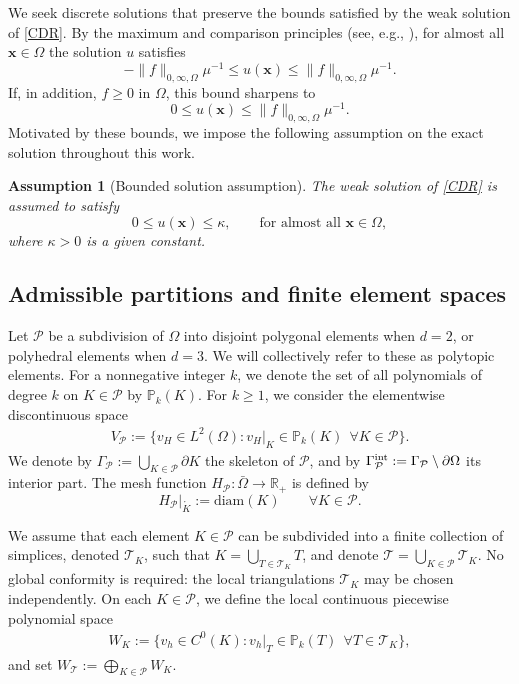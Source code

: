 \documentclass[11pt,final]{amsart}
\theoremstyle{plain}
\newtheorem{assumption}[theorem]{Assumption}
\theoremstyle{definition}
\newcommand\calP{{\mathcal{P}}}
\newcommand\calT{{\mathcal{T}}}
\begin{document}
We seek discrete solutions that preserve the bounds satisfied by the
weak solution of \eqref{CDR}.  By the maximum and comparison
principles (see, e.g., \cite[Corollary~4.4]{renardy2006introduction}),
for almost all $\boldsymbol{x} \in \Omega$ the solution $u$ satisfies
\begin{equation}
-\|f\|_{0,\infty,\Omega} \mu^{-1}  \le  u(\boldsymbol{x})  \le  \|f\|_{0,\infty,\Omega} \mu^{-1}.
\end{equation}
If, in addition, $f \ge 0$ in $\Omega$, this bound sharpens to
\begin{equation}
0  \le  u(\boldsymbol{x})  \le  \|f\|_{0,\infty,\Omega} \mu^{-1}.
\end{equation}
Motivated by these bounds, we impose the following assumption on the
exact solution throughout this work.
\begin{assumption}[Bounded solution assumption]
The weak solution of \eqref{CDR} is assumed to satisfy
\begin{equation}\label{eq14}
0  \leq  u(\boldsymbol{x})  \leq  \kappa, 
\qquad \text{for almost all } \boldsymbol{x} \in \Omega,
\end{equation}
where $\kappa > 0$ is a given constant.
\end{assumption}

\subsection{Admissible partitions and finite element spaces} \label{sec2.2}

Let $\calP$ be a subdivision of $\Omega$ into disjoint polygonal
elements when $d=2$, or polyhedral elements when $d=3$. We will
collectively refer to these as polytopic elements. For a nonnegative
integer $k$, we denote the set of all polynomials of degree $k$ on $K
\in \calP$ by $\mathbb{P}_{k}(K)$. For $k \geq 1$, we consider the
elementwise discontinuous space
\begin{align}
  \label{eq:dgspace}
  V_\calP := \{ v_H \in L^{2}(\Omega) : v_H|_{K} \in \mathbb{P}_{k}(K) \ \ \forall K \in \calP \}.
\end{align}
We denote by $\Gamma_\calP := \bigcup_{K\in\calP}\partial K$ the
skeleton of $\calP$, and by $\Gamma_\calP^{\rm int} := \Gamma_\calP
\setminus \partial \Omega$ its interior part. The mesh function
$H_\calP:\bar{\Omega}\to\mathbb{R}_+$ is defined by
\[
H_\calP|_{\mathring{K}} := \mathrm{diam}(K) \qquad \forall K \in \calP.
\]

We assume that each element $K \in \calP$ can be subdivided into a
finite collection of simplices, denoted $\calT_K$, such that $K =
\bigcup_{T\in\calT_K} T$, and denote $\calT = \bigcup_{K\in \calP}
\calT_K$. No global conformity is required: the local triangulations
$\calT_K$ may be chosen independently. On each $K\in\calP$, we define
the local continuous piecewise polynomial space
\begin{align}
  W_{K} := \{ v_h \in C^{0}(K) : v_h|_{T} \in \mathbb{P}_{k}(T) \ \ \forall T\in \calT_{K} \},
\end{align}
and set $W_\calT := \bigoplus_{K\in\calP} W_{K}$.
\end{document}
